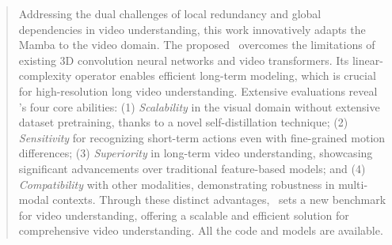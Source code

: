 \begin{abstract}

Addressing the dual challenges of local redundancy and global dependencies in video understanding,
this work innovatively adapts the Mamba to the video domain.
The proposed \ModelName\  overcomes the limitations of existing 3D convolution neural networks and video transformers.
Its linear-complexity operator enables efficient long-term modeling, 
which is crucial for high-resolution long video understanding. 
Extensive evaluations reveal \ModelName's four core abilities: 
(1) \textit{Scalability} in the visual domain without extensive dataset pretraining, 
thanks to a novel self-distillation technique; 
(2) \textit{Sensitivity} for recognizing short-term actions even with fine-grained motion differences; 
(3) \textit{Superiority} in long-term video understanding, showcasing significant advancements over traditional feature-based models; 
and (4) \textit{Compatibility} with other modalities, 
demonstrating robustness in multi-modal contexts. 
Through these distinct advantages, 
\ModelName\  sets a new benchmark for video understanding, 
offering a scalable and efficient solution for comprehensive video understanding.
All the code and models are available.

\end{abstract}



